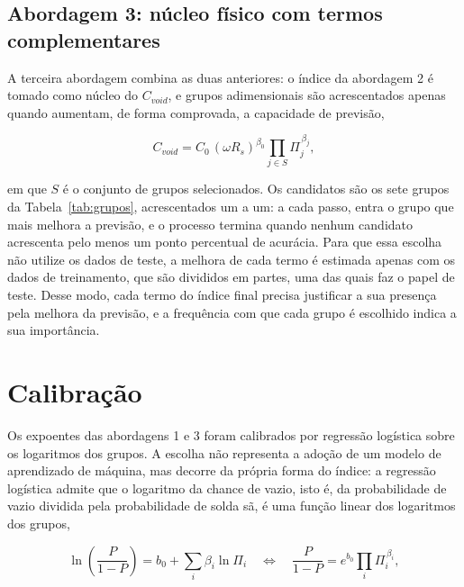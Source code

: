 \documentclass[12pt,openany]{report}
\begin{document}
\subsection{Abordagem 3: núcleo físico com termos complementares}
\label{sec:abordagem_c}

A terceira abordagem combina as duas anteriores: o índice da abordagem 2 é tomado como núcleo do $C_{void}$, e grupos adimensionais são acrescentados apenas quando aumentam, de forma comprovada, a capacidade de previsão,

\begin{equation}
C_{void} = C_0\,(\omega R_s)^{\beta_0} \prod_{j \in S} \Pi_{j}^{\,\beta_j},
\label{eq:cvoid_c}
\end{equation}

\noindent em que $S$ é o conjunto de grupos selecionados. Os candidatos são os sete grupos da Tabela~\ref{tab:grupos}, acrescentados um a um: a cada passo, entra o grupo que mais melhora a previsão, e o processo termina quando nenhum candidato acrescenta pelo menos um ponto percentual de acurácia. Para que essa escolha não utilize os dados de teste, a melhora de cada termo é estimada apenas com os dados de treinamento, que são divididos em partes, uma das quais faz o papel de teste. Desse modo, cada termo do índice final precisa justificar a sua presença pela melhora da previsão, e a frequência com que cada grupo é escolhido indica a sua importância.

\section{Calibração}
\label{sec:calibracao}

Os expoentes das abordagens 1 e 3 foram calibrados por regressão logística sobre os logaritmos dos grupos. A escolha não representa a adoção de um modelo de aprendizado de máquina, mas decorre da própria forma do índice: a regressão logística admite que o logaritmo da chance de vazio, isto é, da probabilidade de vazio dividida pela probabilidade de solda sã, é uma função linear dos logaritmos dos grupos,

\begin{equation}
\ln\left(\frac{P}{1-P}\right) = b_0 + \sum_i \beta_i \ln \Pi_i \quad \Longleftrightarrow \quad \frac{P}{1-P} = e^{b_0}\prod_i \Pi_{i}^{\,\beta_i},
\label{eq:logistica}
\end{equation}
\end{document}
